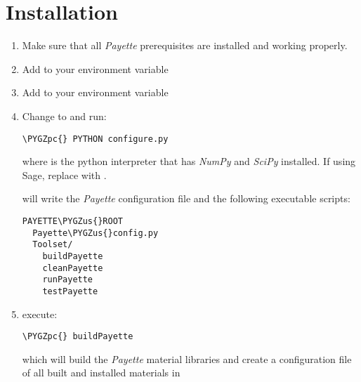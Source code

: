 \documentclass[letterpaper,10pt,english]{sphinxmanual}
\def\PYGZus{\char`\_}
\def\PYGZpc{\char`\%}
\begin{document}
\section{Installation}
\label{Files/building:installation}\begin{enumerate}
\item {} 
Make sure that all \emph{Payette} prerequisites are installed and working properly.

\item {} 
Add  to your  environment variable

\item {} 
Add  to your  environment variable

\item {} 
Change to  and run:

\begin{Verbatim}[commandchars=\\\{\}]
\PYGZpc{} PYTHON configure.py
\end{Verbatim}

where  is the python interpreter that has \emph{NumPy} and \emph{SciPy}
installed. If using Sage, replace  with .

 will write the \emph{Payette} configuration file and the
following executable scripts:

\begin{Verbatim}[commandchars=\\\{\}]
PAYETTE\PYGZus{}ROOT
  Payette\PYGZus{}config.py
  Toolset/
    buildPayette
    cleanPayette
    runPayette
    testPayette
\end{Verbatim}

\end{enumerate}
\begin{enumerate}
\setcounter{enumi}{4}
\item {} 
execute:

\begin{Verbatim}[commandchars=\\\{\}]
\PYGZpc{} buildPayette
\end{Verbatim}

which will build the \emph{Payette} material libraries and create a configuration
file of all built and installed materials in

\end{enumerate}
\end{document}
